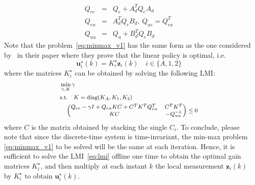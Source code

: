 \documentclass{ifacconf}
\begin{document}
\begin{eqnarray}
    Q_{ee} &=& Q_e + A_d^T Q_e A_d \\
    Q_{eu} &=& A_d^T Q_e B_d,\ Q_{ue} = Q^T_{eu} \\
    Q_{uu} &=& Q_u + B_d^T Q_e B_d
\end{eqnarray}
Note that the problem~\eqref{eq:minmax_v1} has the same form as 
the one considered by~\cite{gattami_robust_2012} in their paper
where they prove that the linear policy is optimal, i.e.
\begin{equation}
    \boldsymbol{u}^\star_{i}(k) = K^\star_i \boldsymbol{z}_{i}(k) \quad i \in \{A,1,2\} 
\end{equation}
where the matrices $K^\star_i$ can be obtained by solving 
the following LMI:
\begin{equation}
    \small
    \begin{split}
        &\min_{\gamma , K} \gamma \\
        &\text{s.t.} \quad K = \text{diag}(K_A, K_1, K_2) \\
        &\quad \left(
            \begin{matrix}
                Q_{ee} - \gamma I + Q_{eu} K C + C^T K^T Q_{eu}^T & C^T K^T \\
                KC & -Q_{uu}^{-1}
            \end{matrix}
        \right) \leq 0
    \end{split}
    \label{eq:lmi}
\end{equation}
where $C$ is the matrix obtained by stacking the single $C_i$.
To conclude, please note that since the discrete-time system is time-invariant, 
the min-max problem \eqref{eq:minmax_v1} to be solved  will be the same at each iteration.
Hence, it is sufficient to solve the LMI~\eqref{eq:lmi} offline one time to obtain 
the optimal gain matrices $K^\star_i$, and then multiply at each instant $k$ 
the local measurement $\boldsymbol{z}_{i}(k)$ by $K^\star_i$ to obtain $\boldsymbol{u}^\star_{i}(k)$.
\end{document}
